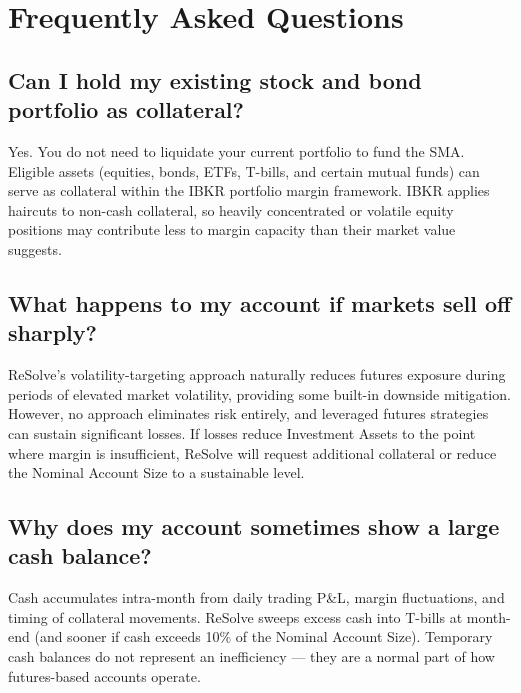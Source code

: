 \documentclass{resolve-whitepaper}
\begin{document}
\section{Frequently Asked Questions}\label{frequently-asked-questions}

\subsection{Can I hold my existing stock and bond portfolio as
collateral?}\label{can-i-hold-my-existing-stock-and-bond-portfolio-as-collateral}

Yes. You do not need to liquidate your current portfolio to fund the
SMA. Eligible assets (equities, bonds, ETFs, T-bills, and certain mutual
funds) can serve as collateral within the IBKR portfolio margin
framework. IBKR applies haircuts to non-cash collateral, so heavily
concentrated or volatile equity positions may contribute less to margin
capacity than their market value suggests.

\subsection{What happens to my account if markets sell off
sharply?}\label{what-happens-to-my-account-if-markets-sell-off-sharply}

ReSolve's volatility-targeting approach naturally reduces futures
exposure during periods of elevated market volatility, providing some
built-in downside mitigation. However, no approach eliminates risk
entirely, and leveraged futures strategies can sustain significant
losses. If losses reduce Investment Assets to the point where margin is
insufficient, ReSolve will request additional collateral or reduce the
Nominal Account Size to a sustainable level.

\subsection{Why does my account sometimes show a large cash
balance?}\label{why-does-my-account-sometimes-show-a-large-cash-balance}

Cash accumulates intra-month from daily trading P\&L, margin
fluctuations, and timing of collateral movements. ReSolve sweeps excess
cash into T-bills at month-end (and sooner if cash exceeds 10\% of the
Nominal Account Size). Temporary cash balances do not represent an
inefficiency --- they are a normal part of how futures-based accounts
operate.
\end{document}
